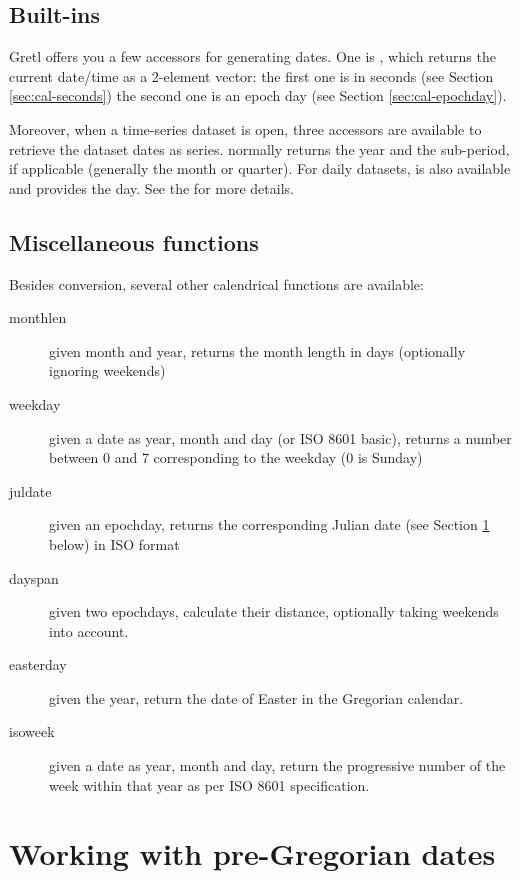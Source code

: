 \subsection{Built-ins}
\label{sec:cal-builtins}

Gretl offers you a few accessors for generating dates. One is
, which returns the current date/time as a 2-element
vector: the first one is in seconds (see Section
\ref{sec:cal-seconds}) the second one is an epoch day (see Section
\ref{sec:cal-epochday}).

Moreover, when a time-series dataset is open, three accessors are
available to retrieve the dataset dates as series. 
normally returns the year and  the sub-period, if
applicable (generally the month or quarter). For daily datasets,
 is also available and provides the day. See the
\GCR{} for more details.

\subsection{Miscellaneous functions}
\label{sec:cal-misc}

Besides conversion, several other calendrical functions are available:
\begin{description}
\item[monthlen] given month and year, returns the month length in days
  (optionally ignoring weekends)
\item[weekday] given a date as year, month and day (or ISO 8601
  basic), returns a number between 0 and 7 corresponding to the weekday
  (0 is Sunday)
\item[juldate] given an epochday, returns the corresponding Julian
  date (see Section \ref{sec:cal-conversion} below) in ISO format
\item[dayspan] given two epochdays, calculate their distance,
  optionally taking weekends into account.
\item[easterday] given the year, return the date of Easter in the
  Gregorian calendar.
\item[isoweek] given a date as year, month and day, return the
  progressive number of the week within that year as per ISO 8601
  specification.
\end{description}


\section{Working with pre-Gregorian dates}
\label{sec:cal-conversion}

